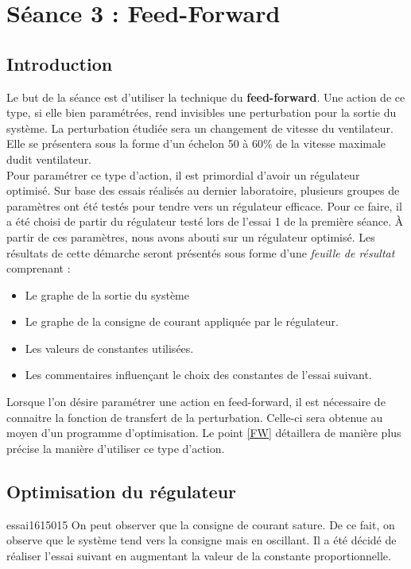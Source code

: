 \section{Séance 3 : Feed-Forward}
\subsection{Introduction}
Le but de la séance est d'utiliser la technique du \textbf{feed-forward}. Une action de ce type, si elle bien paramétrées, rend invisibles une perturbation pour la sortie du système. La perturbation étudiée sera un changement de vitesse du ventilateur. Elle se présentera sous la forme d'un échelon 50 à 60\% de la vitesse maximale dudit ventilateur.\\

Pour paramétrer ce type d'action, il est primordial d'avoir un régulateur optimisé. Sur base des essais réalisés au dernier laboratoire, plusieurs groupes de paramètres ont été testés pour tendre vers un régulateur efficace. Pour ce faire, il a été choisi de partir du régulateur testé lors de l'essai 1 de la première séance. À partir de ces paramètres, nous avons abouti sur un régulateur optimisé. Les résultats de cette démarche seront présentés sous forme d'une \textit{feuille de résultat} comprenant :
\begin{itemize}
\item Le graphe de la sortie du système 
\item Le graphe de la consigne de courant appliquée par le régulateur.
\item Les valeurs de constantes utilisées.
\item Les commentaires influençant le choix des constantes de l'essai suivant.
\end{itemize}

Lorsque l'on désire paramétrer une action en feed-forward, il est nécessaire de connaitre la fonction de transfert de la perturbation. Celle-ci sera obtenue au moyen d'un programme d'optimisation. Le point \ref{FW} détaillera de manière plus précise la manière d'utiliser ce type d'action.\\ 


\subsection{Optimisation du régulateur}
\label{opt-reg}

\begin{optibox}{essai1}{6}{150}{15}
On peut observer que la consigne de courant sature. De ce fait, on observe que le système tend vers la consigne mais en oscillant.  Il a été décidé de réaliser l'essai suivant en augmentant la valeur de la constante proportionnelle.
\\\hline
\end{optibox}

